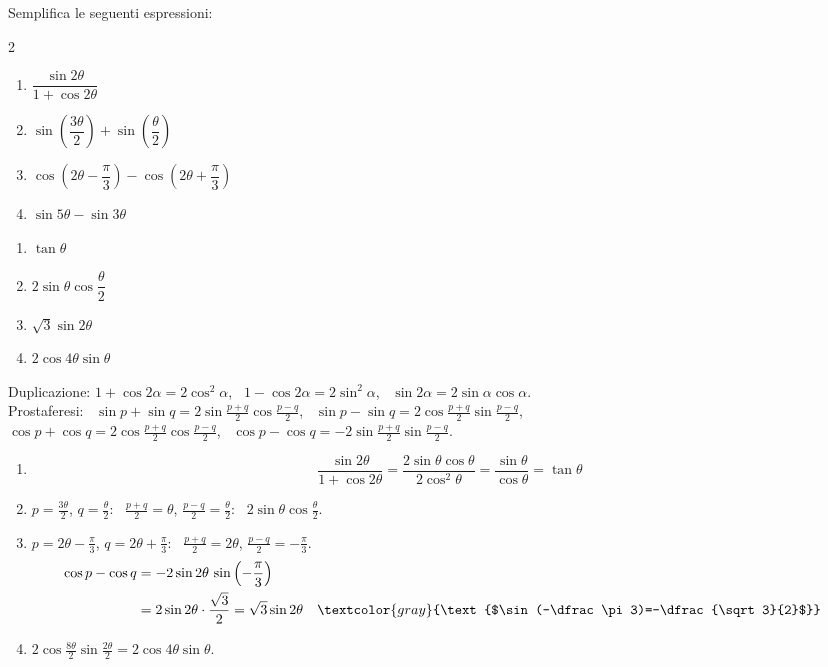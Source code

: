 \begin{question}[ID=2.3, subtitle={Semplificazione con duplicazione e prostaferesi}, tags={goniometria, formule di duplicazione, prostaferesi}, difficulty=facile]
Semplifica le seguenti espressioni:
\begin{multicols}{2}
\begin{enumerate}
\item $\dfrac{\sin 2\theta}{1 + \cos 2\theta}$
\item $\sin\!\left(\dfrac{3\theta}{2}\right) + \sin\!\left(\dfrac{\theta}{2}\right)$
\item $\cos\!\left(2\theta - \dfrac{\pi}{3}\right) - \cos\!\left(2\theta + \dfrac{\pi}{3}\right)$
\item $\sin 5\theta - \sin 3\theta$
\end{enumerate}
\end{multicols}
\begin{solution}
\begin{enumerate}
    \item $\tan\theta$
    \item $2\sin\theta\cos\dfrac\theta2$
    \item $\sqrt3\sin2\theta$
    \item $2\cos4\theta\sin\theta$
\end{enumerate}
\end{solution}
\begin{explanation}
Duplicazione: $1+\cos2\alpha=2\cos^2\alpha$, \ $1-\cos2\alpha=2\sin^2\alpha$, \ $\sin2\alpha=2\sin\alpha\cos\alpha$. \\
Prostaferesi: \ $\sin p+\sin q=2\sin\tfrac{p+q}{2}\cos\tfrac{p-q}{2}$, \ $\sin p-\sin q=2\cos\tfrac{p+q}{2}\sin\tfrac{p-q}{2}$, \\
$\cos p+\cos q=2\cos\tfrac{p+q}{2}\cos\tfrac{p-q}{2}$, \ $\cos p-\cos q=-2\sin\tfrac{p+q}{2}\sin\tfrac{p-q}{2}$.
\begin{enumerate}
    \item \[ \dfrac{\sin2\theta}{1+\cos2\theta}=\dfrac{2\sin\theta\cos\theta}{2\cos^2\theta}=\dfrac{\sin\theta}{\cos\theta}=\tan\theta \]
    \item $p=\tfrac{3\theta}{2}$, $q=\tfrac\theta2$: \ $\tfrac{p+q}{2}=\theta$, $\tfrac{p-q}{2}=\tfrac\theta2$: \ $2\sin\theta\cos\tfrac\theta2$.
    \item $p=2\theta-\tfrac\pi3$, $q=2\theta+\tfrac\pi3$: \ $\tfrac{p+q}{2}=2\theta$, $\tfrac{p-q}{2}=-\tfrac\pi3$.
    \[\begin{aligned}
    \cos p-\cos q &= -2\sin2\theta\,\sin\left(-\dfrac\pi3\right)\\
    &= 2\sin2\theta\cdot\dfrac{\sqrt3}{2}=\sqrt3\sin2\theta && \textcolor{gray}{\text{$\sin(-\dfrac\pi3)=-\dfrac{\sqrt3}{2}$}}
    \end{aligned}\]
    \item $2\cos\tfrac{8\theta}{2}\sin\tfrac{2\theta}{2}=2\cos4\theta\sin\theta$.
\end{enumerate}
\end{explanation}
\end{question}

